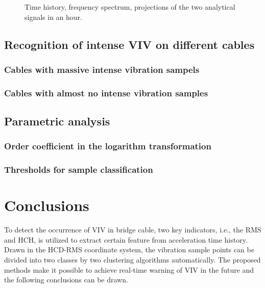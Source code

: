 \documentclass[preprint, 3p, times, compress, 11pt]{elsarticle}
\begin{document}
\begin{figure}[ht]
    \centering
    \qquad
    \caption{Time history, frequency spectrum, projections of the two 
            analytical signals in an hour.}
    \label{fig:time_freq_hilb_deri}
\end{figure}

\subsection{Recognition of intense VIV on different cables}

\subsubsection{Cables with massive intense vibration sampels}

\subsubsection{Cables with almost no intense vibration samples}

\subsection{Parametric analysis}

\subsubsection{Order coefficient in the logarithm transformation}

\subsubsection{Thresholds for sample classification}

\clearpage

\section{Conclusions}
\label{sec:conclusion}

To detect the occurrence of VIV in bridge cable, two key indicators, i.e., 
the RMS and HCH, is utilized to extract certain feature from acceleration 
time history. Drawn in the HCD-RMS coordinate system, the vibration sample 
points can be divided into two classes by two clustering algorithms 
automatically. The proposed methods make it possible to achieve real-time 
warning of VIV in the future and the following conclusions can be drawn.
\end{document}
